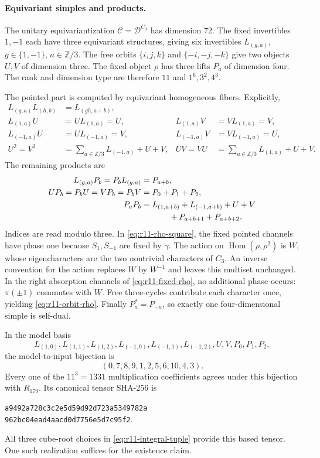 \documentclass[11pt,a4paper]{article}
\begin{document}
\paragraph{Equivariant simples and products.}
The unitary equivariantization
$\mathcal C=\mathcal D^{C_3}$ has dimension $72$.
The fixed invertibles $1,-1$ each have three equivariant structures,
giving six invertibles $L_{(g,a)}$, $g\in\{1,-1\}$,
$a\in\mathbb Z/3$. The free orbits
$\{i,j,k\}$ and $\{-i,-j,-k\}$ give two objects $U,V$ of dimension three.
The fixed object $\rho$ has three lifts $P_a$ of dimension four.
The rank and dimension type are therefore $11$ and $1^6,3^2,4^3$.

The pointed part is computed by equivariant homogeneous fibers. Explicitly,
\begin{align*}
 L_{(g,a)}L_{(h,b)}&=L_{(gh,a+b)},\\
 L_{(1,a)}U&=U L_{(1,a)}=U,
 &L_{(1,a)}V&=V L_{(1,a)}=V,\\
 L_{(-1,a)}U&=U L_{(-1,a)}=V,
 &L_{(-1,a)}V&=V L_{(-1,a)}=U,\\
 U^2=V^2&=\sum_{a\in\mathbb Z/3}L_{(-1,a)}+U+V,
 &UV=VU&=\sum_{a\in\mathbb Z/3}L_{(1,a)}+U+V.
\end{align*}
The remaining products are
\begin{align}
 L_{(g,a)}P_b=P_bL_{(g,a)}&=P_{a+b},\label{eq:r11-fixed-rho}\\
 UP_b=P_bU=VP_b=P_bV&=P_0+P_1+P_2,\label{eq:r11-orbit-rho}\\
 P_aP_b&=L_{(1,a+b)}+L_{(-1,a+b)}+U+V\notag\\
 &\hspace{12mm}+P_{a+b+1}+P_{a+b+2}.
 \label{eq:r11-rho-square}
\end{align}
Indices are read modulo three. In \eqref{eq:r11-rho-square}, the fixed
pointed channels have phase one because $S_1,S_{-1}$ are fixed by
$\gamma$. The action on $\operatorname{Hom}(\rho,\rho^2)$ is $W$, whose
eigencharacters are the two nontrivial characters of $C_3$. An inverse
convention for the action replaces $W$ by $W^{-1}$ and leaves this
multiset unchanged. In the right absorption channels of
\eqref{eq:r11-fixed-rho}, no additional phase occurs: $\pi(\pm1)$ commutes
with $W$. Free three-cycles contribute each character once, yielding
\eqref{eq:r11-orbit-rho}. Finally $P_a^*=P_{-a}$, so exactly one
four-dimensional simple is self-dual.

In the model basis
\[
 L_{(1,0)},L_{(1,1)},L_{(1,2)},
 L_{(-1,0)},L_{(-1,1)},L_{(-1,2)},U,V,P_0,P_1,P_2,
\]
the model-to-input bijection is
\begin{equation}\label{eq:r11-179-bijection}
 (0,7,8,9,1,2,5,6,10,4,3).
\end{equation}
Every one of the $11^3=1331$ multiplication coefficients agrees under
this bijection with $R_{179}$. Its canonical tensor SHA-256 is
\begin{center}\small
\texttt{a9492a728c3c2e5d59d92d723a5349782a}\\[-1mm]
\texttt{962bc04ead4aacd0d7756e5d7c95f2}.
\end{center}
All three cube-root choices in \eqref{eq:r11-integral-tuple} provide
this based tensor. One such realization suffices for the existence claim.
\end{document}
